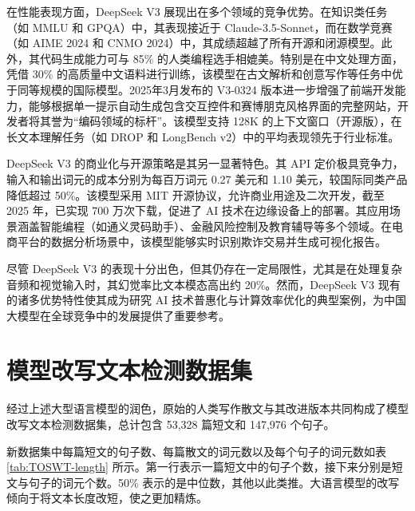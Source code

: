 在性能表现方面，DeepSeek V3 展现出在多个领域的竞争优势。在知识类任务（如 MMLU 和 GPQA）中，其表现接近于 Claude-3.5-Sonnet，而在数学竞赛（如 AIME 2024 和 CNMO 2024）中，其成绩超越了所有开源和闭源模型。此外，其代码生成能力可与 85\% 的人类编程选手相媲美。特别是在中文处理方面，凭借 30\% 的高质量中文语料进行训练，该模型在古文解析和创意写作等任务中优于同等规模的国际模型。2025年3月发布的 V3-0324 版本进一步增强了前端开发能力，能够根据单一提示自动生成包含交互控件和赛博朋克风格界面的完整网站，开发者将其誉为“编码领域的标杆”。该模型支持 128K 的上下文窗口（开源版），在长文本理解任务（如 DROP 和 LongBench v2）中的平均表现领先于行业标准。

DeepSeek V3 的商业化与开源策略是其另一显著特色。其 API 定价极具竞争力，输入和输出词元的成本分别为每百万词元 0.27 美元和 1.10 美元，较国际同类产品降低超过 50\%。该模型采用 MIT 开源协议，允许商业用途及二次开发，截至 2025 年，已实现 700 万次下载，促进了 AI 技术在边缘设备上的部署。其应用场景涵盖智能编程（如通义灵码助手）、金融风险控制及教育辅导等多个领域。在电商平台的数据分析场景中，该模型能够实时识别欺诈交易并生成可视化报告。

尽管 DeepSeek V3 的表现十分出色，但其仍存在一定局限性，尤其是在处理复杂音频和视觉输入时，其幻觉率比文本模态高出约 20\%。然而，DeepSeek V3 现有的诸多优势特性使其成为研究 AI 技术普惠化与计算效率优化的典型案例，为中国大模型在全球竞争中的发展提供了重要参考。

\section{模型改写文本检测数据集}
\label{sec:TOSWT-info}

经过上述大型语言模型的润色，原始的人类写作散文与其改进版本共同构成了模型改写文本检测数据集，总计包含 53,328 篇短文和 147,976 个句子。

新数据集中每篇短文的句子数、每篇散文的词元数以及每个句子的词元数如表 \ref{tab:TOSWT-length} 所示。第一行表示一篇短文中的句子个数，接下来分别是短文与句子的词元个数。50\% 表示的是中位数，其他以此类推。大语言模型的改写倾向于将文本长度改短，使之更加精炼。

